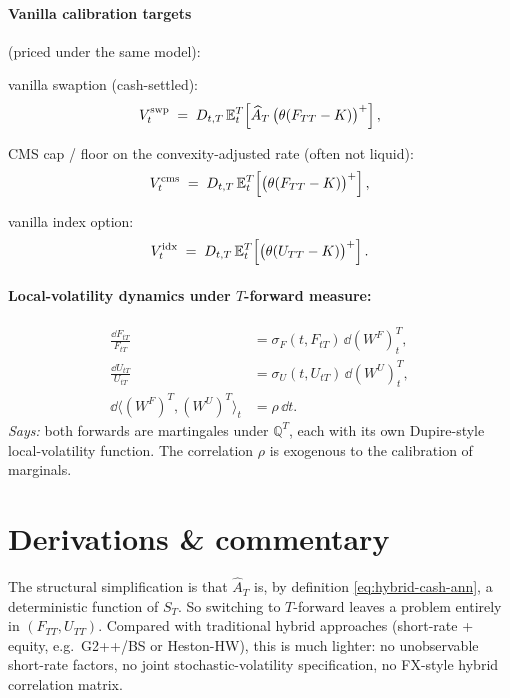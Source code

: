 \documentclass[11pt,a4paper]{article}
\begin{document}
\paragraph{Vanilla calibration targets} (priced under the same model):

vanilla swaption (cash-settled):
\begin{equation}\label{eq:hybrid-vanilla-swp}
  V^{\text{swp}}_t \;=\; D_{t,T}\, \mathbb{E}^T_t\!\left[ \widehat A_T \, \bigl(\theta(F_{TT} - K)\bigr)^+ \right],
\end{equation}

CMS cap / floor on the convexity-adjusted rate (often not liquid):
\begin{equation}\label{eq:hybrid-vanilla-cms}
  V^{\text{cms}}_t \;=\; D_{t,T}\, \mathbb{E}^T_t\!\left[ \bigl(\theta(F_{TT} - K)\bigr)^+ \right],
\end{equation}

vanilla index option:
\begin{equation}\label{eq:hybrid-vanilla-idx}
  V^{\text{idx}}_t \;=\; D_{t,T}\, \mathbb{E}^T_t\!\left[ \bigl(\theta(U_{TT} - K)\bigr)^+ \right].
\end{equation}

\paragraph{Local-volatility dynamics under $T$-forward measure:}
\begin{align}
  \frac{\dd F_{tT}}{F_{tT}} &= \sigma_F(t, F_{tT})\, \dd (W^F)^T_t, \label{eq:hybrid-dyn-F}\\
  \frac{\dd U_{tT}}{U_{tT}} &= \sigma_U(t, U_{tT})\, \dd (W^U)^T_t, \label{eq:hybrid-dyn-U}\\
  \dd\langle (W^F)^T, (W^U)^T\rangle_t &= \rho\, \dd t.
\end{align}
\textit{Says:} both forwards are martingales under $\mathbb{Q}^T$,
each with its own Dupire-style local-volatility function. The
correlation $\rho$ is exogenous to the calibration of marginals.

\section{Derivations \& commentary}

\begin{commentary}
The structural simplification is that $\widehat A_T$ is, by
definition \eqref{eq:hybrid-cash-ann}, a deterministic function of
$S_T$. So switching to $T$-forward leaves a problem entirely in
$(F_{TT}, U_{TT})$. Compared with traditional hybrid approaches
(short-rate + equity, e.g.\ G2++/BS or Heston-HW), this is much
lighter: no unobservable short-rate factors, no joint
stochastic-volatility specification, no FX-style hybrid correlation
matrix.
\end{commentary}
\end{document}
